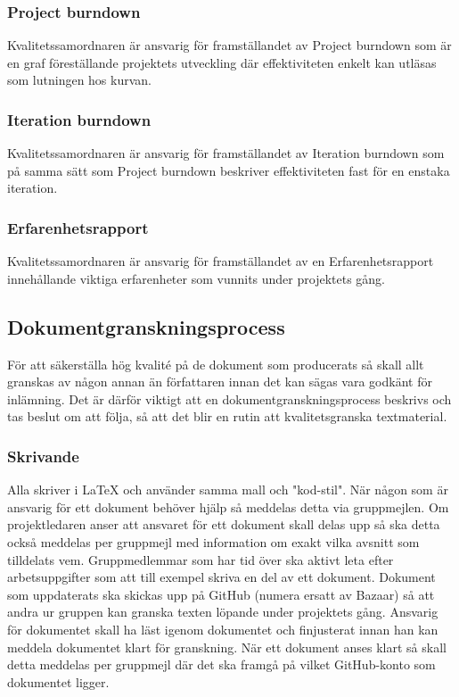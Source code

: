 \subsubsection{Project burndown}
Kvalitetssamordnaren är ansvarig för framställandet av Project burndown som är en graf föreställande projektets utveckling där effektiviteten enkelt kan utläsas som lutningen hos kurvan.

\subsubsection{Iteration burndown}
Kvalitetssamordnaren är ansvarig för framställandet av Iteration burndown som på samma sätt som Project burndown beskriver effektiviteten fast för en enstaka iteration.

\subsubsection{Erfarenhetsrapport}
Kvalitetssamordnaren är ansvarig för framställandet av en Erfarenhetsrapport innehållande viktiga erfarenheter som vunnits under projektets gång.

\subsection{Dokumentgranskningsprocess}
För att säkerställa hög kvalité på de dokument som producerats så skall allt granskas av någon annan än författaren innan det kan sägas vara godkänt för inlämning. Det är därför viktigt att en dokumentgranskningsprocess beskrivs och tas beslut om att följa, så att det blir en rutin att kvalitetsgranska textmaterial.

\subsubsection{Skrivande}
Alla skriver i LaTeX och använder samma mall och "kod-stil". När någon som är ansvarig för ett dokument behöver hjälp så meddelas detta via gruppmejlen. Om projektledaren anser att ansvaret för ett dokument skall delas upp så ska detta också meddelas per gruppmejl med information om exakt vilka avsnitt som tilldelats vem. Gruppmedlemmar som har tid över ska aktivt leta efter arbetsuppgifter som att till exempel skriva en del av ett dokument. Dokument som uppdaterats ska skickas upp på GitHub (numera ersatt av Bazaar) så att andra ur gruppen kan granska texten löpande under projektets gång. Ansvarig för dokumentet skall ha läst igenom dokumentet och finjusterat innan han kan meddela dokumentet klart för granskning. När ett dokument anses klart så skall detta meddelas per gruppmejl där det ska framgå på vilket GitHub-konto som dokumentet ligger.

